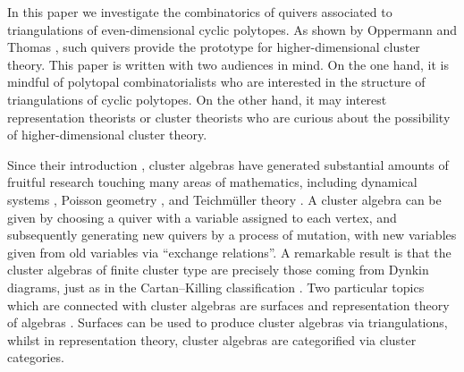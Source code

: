 \documentclass[ALCO,Unicode,published]{cedram}
\title
{Quiver combinatorics and triangulations of cyclic polytopes}
\author[\initial{N.} \middlename{J.} Williams]{\firstname{Nicholas} \middlename{J.} \lastname{Williams}}
\begin{document}
\newtheorem{obs}[cdrthm]{Observation}

\begin{abstract}
Motivated by higher homological algebra, we associate quivers to triangulations of even-dimensional cyclic polytopes and prove two results showing what information about the triangulation is encoded in the quiver. We first show that the cut quivers of Iyama and Oppermann correspond precisely to $2d$-dimensional triangulations without interior $(d + 1)$-simplices. This implies that these triangulations form a connected subgraph of the flip graph. Our second result shows how the quiver of a triangulation can be used to identify mutable internal $d$-simplices. This points towards what a theory of higher-dimensional quiver mutation might look like and gives a new way of understanding flips of triangulations of even-dimensional cyclic polytopes.
\end{abstract}


\maketitle

\noindent
In this paper we investigate the combinatorics of quivers associated to triangulations of even-dimensional cyclic polytopes. As shown by Oppermann and Thomas \cite{ot}, such quivers provide the prototype for higher-dimensional cluster theory. This paper is written with two audiences in mind. On the one hand, it is mindful of polytopal combinatorialists who are interested in the structure of triangulations of cyclic polytopes. On the other hand, it may interest representation theorists or cluster theorists who are curious about the possibility of higher-dimensional cluster theory.

Since their introduction \cite{fz1}, cluster algebras have generated substantial amounts of fruitful research touching many areas of mathematics, including dynamical systems \cite{fz-laurent,cs_cube,speyer_oct}, Poisson geometry \cite{gsv03,gsv05}, and Teichm\"uller theory \cite{fg06,fg09}. A cluster algebra can be given by choosing a quiver with a variable assigned to each vertex, and subsequently generating new quivers by a process of mutation, with new variables given from old variables via ``exchange relations''. A remarkable result is that the cluster algebras of finite cluster type are precisely those coming from Dynkin diagrams, just as in the Cartan--Killing classification \cite{fz2}. Two particular topics which are connected with cluster algebras are surfaces \cite{fst} and representation theory of algebras \cite{ccs,bmrrt}. Surfaces can be used to produce cluster algebras via triangulations, whilst in representation theory, cluster algebras are categorified via cluster categories.
\end{document}
